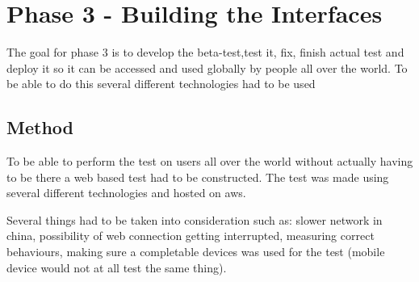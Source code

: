 
\chapter{Phase 3 - Building the Interfaces} %

\label{Chapter6} %

The goal for phase 3 is to develop the beta-test,test it, fix, finish actual test and deploy it so it can be accessed and used globally by people all over the world. To be able to do this several different technologies had to be used
\section{Method}
To be able to perform the test on users all over the world without actually having to be there a web based test had to be constructed. The test was made using several different technologies and hosted on aws. 

Several things had to be taken into consideration such as: slower network in china, possibility of web connection getting interrupted, measuring correct behaviours, making sure a completable devices was used for the test (mobile device would not at all test the same thing).


